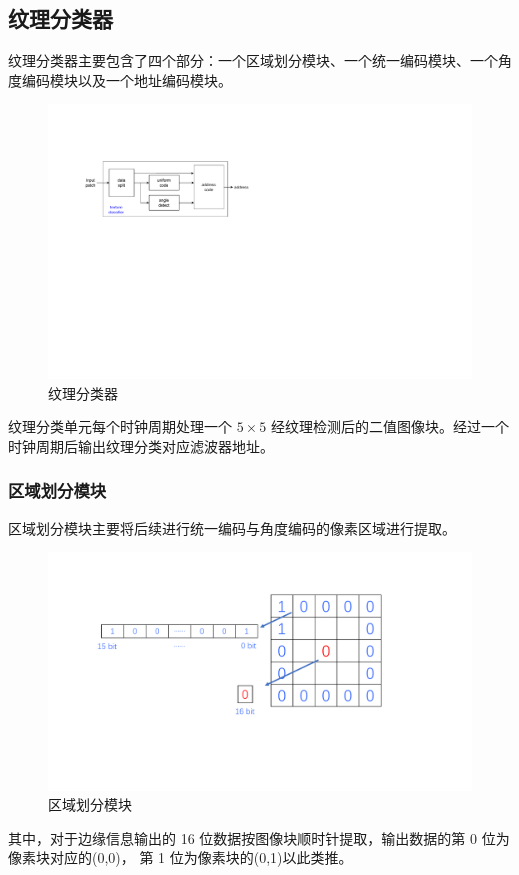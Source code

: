 \documentclass[12pt, a4paper, oneside]{ctexbook}
\begin{document}
	\subsection{纹理分类器}
	纹理分类器主要包含了四个部分：一个区域划分模块、一个统一编码模块、一个角度编码模块以及一个地址编码模块。
	\begin{figure}[h]	
		\centering
		\includegraphics[scale=1.0]{pic/texture_classifier.pdf}
		\caption{纹理分类器}
	\end{figure}
	纹理分类单元每个时钟周期处理一个 $5\times5$ 经纹理检测后的二值图像块。经过一个时钟周期后输出纹理分类对应滤波器地址。
	\subsubsection{区域划分模块}
	区域划分模块主要将后续进行统一编码与角度编码的像素区域进行提取。
	\begin{figure}[h]	
		\centering
		\includegraphics[scale=0.5]{pic/patch.pdf}
		\caption{区域划分模块}
	\end{figure}			
	\par 其中，对于边缘信息输出的 16 位数据按图像块顺时针提取，输出数据的第 0 位为像素块对应的(0,0)，
	第 1 位为像素块的(0,1)以此类推。
\end{document}
